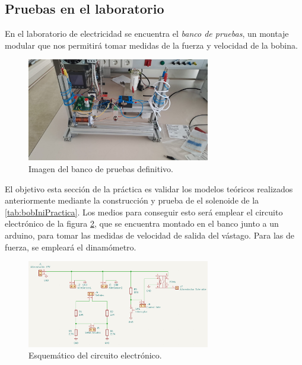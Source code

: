 \subsection*{Pruebas en el laboratorio}

En el laboratorio de electricidad se encuentra el \textit{banco de pruebas}, un montaje modular que nos permitirá tomar medidas de la fuerza y velocidad de la bobina.

\begin{figure}[H]
    \centering
    \includegraphics[width=8cm]{FigurasMemoria/prototipoFinal.jpeg}
    \caption{Imagen del banco de pruebas definitivo.}
    \label{fig:prototipoFinal} %
\end{figure}

El objetivo esta sección de la práctica es validar los modelos teóricos realizados anteriormente mediante la construcción y prueba de el solenoide de la \ref{tab:bobIniPractica}. Los medios para conseguir esto será emplear el circuito electrónico de la figura \ref{fig:esquematicoPCBPractica}, que se encuentra montado en el banco junto a un arduino, para tomar las medidas de velocidad de salida del vástago. Para las de fuerza, se empleará el dinamómetro.

\begin{figure}[H]
    \centering 
    \includegraphics[width=8cm]{FigurasMemoria/esquematicoPCB.png}
    \caption{Esquemático del circuito electrónico.}
    \label{fig:esquematicoPCBPractica} %
\end{figure}